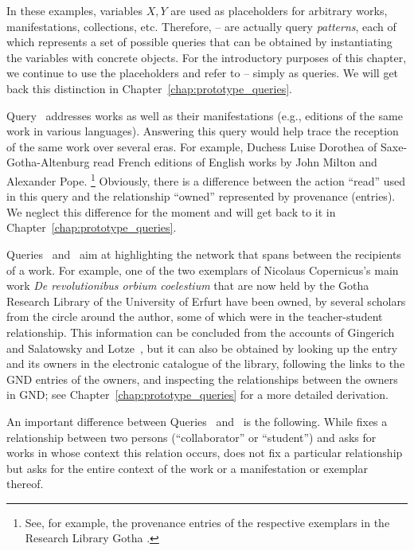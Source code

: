 %
In these examples, variables $X,Y$ are used as placeholders for arbitrary works,
manifestations, collections, etc. Therefore, -- are actually
query \emph{patterns}, each of which represents a set of possible queries
that can be obtained by instantiating the variables with concrete objects.
For the introductory purposes of this chapter,
we continue to use the placeholders and refer to --
simply as queries. We will get back this distinction in Chapter~\ref{chap:prototype_queries}.

Query~ addresses works as well as their manifestations
(e.g., editions of the same work in various languages).
Answering this query would help trace the reception
of the same work over several eras.
For example, Duchess Luise Dorothea of Saxe-Gotha-Altenburg
read French editions of English works by John Milton and Alexander Pope.%
\footnote{See, for example, the provenance entries of the respective exemplars in the Research Library Gotha \autocite{OPACLuiseDorotheaMiltonPope}.}
Obviously, there is a difference between the action \enquote{read}
used in this query and the relationship \enquote{owned} represented by
provenance (entries). We neglect this difference for the moment
and will get back to it in Chapter~\ref{chap:prototype_queries}.

Queries~ and~
aim at highlighting the network
that spans between the recipients of a work.
For example, one of the two exemplars of Nicolaus Copernicus's
main work \emph{De revolutionibus orbium coelestium} \autocite{Kopernikus1543}
that are now held by the Gotha Research Library of the University of Erfurt
have been owned, by several scholars
from the circle around the author,
some of which were in the teacher-student relationship.
This information can be concluded
from the accounts of Gingerich~\autocite[p.\,69]{Gingerich2002}
and Salatowsky and Lotze~\autocite[p.\,142]{Salatowsky2015},
but it can also be obtained by looking up the entry and its owners in the electronic catalogue of the library,
following the links to the GND entries of the owners,
and inspecting the relationships between the owners in GND;
see Chapter~\ref{chap:prototype_queries} for a more detailed derivation.

An important difference between Queries~ and~ is the following.
While  fixes a relationship between two persons (\enquote{collaborator} or \enquote{student})
and asks for works in whose context this relation occurs,
 does not fix a particular relationship but asks for the entire context of
the work or a manifestation or exemplar thereof.

